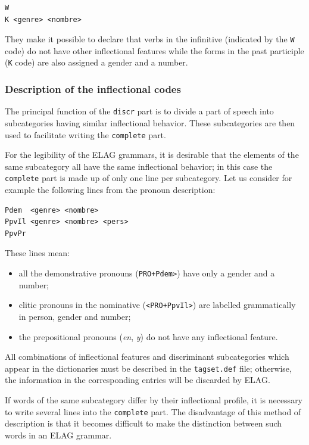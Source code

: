 \begin{itemize}
\begin{verbatim}
W
K <genre> <nombre>
\end{verbatim}

They make it possible to declare that verbs in the infinitive (indicated by the
\verb$W$ code) do not have other inflectional features while the forms in the
past participle (\verb$K$ code) are also assigned a gender and a number.

\end{itemize}

\subsubsection{Description of the inflectional codes}
The principal function of the \verb$discr$ part is to divide a part of speech
into subcategories having similar inflectional behavior. These subcategories are
then used to facilitate writing the \verb$complete$ part.

\bigskip
\noindent For the legibility of the ELAG grammars, it is desirable that the
elements of the same subcategory all have the same inflectional behavior; in this case the
\verb$complete$ part is made up of only one line per subcategory.
Let us consider for example the following lines from the pronoun description:

\begin{verbatim}
Pdem  <genre> <nombre>
PpvIl <genre> <nombre> <pers>
PpvPr
\end{verbatim}

\bigskip
\noindent These lines mean:
\begin{itemize}
  \item all the demonstrative pronouns (\verb$PRO+Pdem>$) have only a gender and a number;
  \item clitic pronouns in the nominative (\verb$<PRO+PpvIl>$) are labelled
  grammatically in person, gender and number;
  \item the prepositional pronouns (\textit{en}, \textit{y}) do not have any
  inflectional feature.
\end{itemize}

\bigskip
\noindent All combinations of inflectional features and discriminant subcategories which
appear in the dictionaries must be described in the \verb$tagset.def$
file; otherwise, the information in the
corresponding entries will be discarded by ELAG.

\bigskip
\noindent If words of the same subcategory differ by their inflectional profile, it is
necessary to write several lines into the \verb$complete$ part. The disadvantage
of this method of description is that it becomes difficult to make the
distinction between such words in an ELAG grammar.

